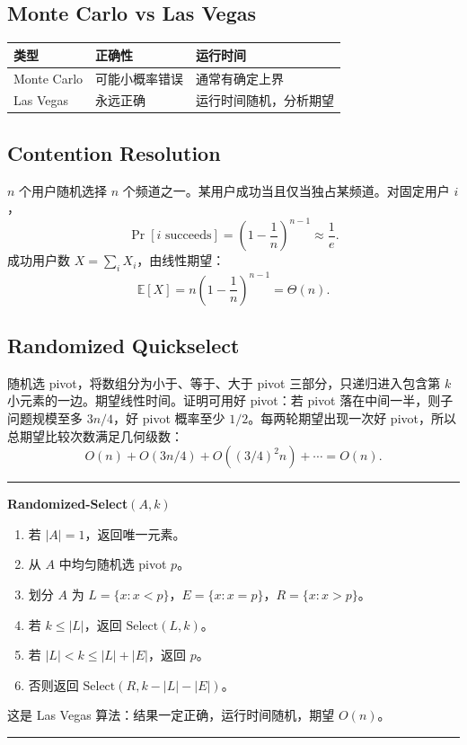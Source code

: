 \documentclass[UTF8,a4paper,11pt]{ctexart}
\newenvironment{algobox}[1]
{\par\medskip\noindent\begin{minipage}{0.96\linewidth}\hrule\vspace{0.35em}\textbf{#1}\par\vspace{0.25em}\small}
{\par\vspace{0.25em}\hrule\end{minipage}\par\medskip}
\begin{document}
\subsection{Monte Carlo vs Las Vegas}

\begin{center}
\begin{tabular}{lll}
\toprule
类型 & 正确性 & 运行时间\\
\midrule
Monte Carlo & 可能小概率错误 & 通常有确定上界\\
Las Vegas & 永远正确 & 运行时间随机，分析期望\\
\bottomrule
\end{tabular}
\end{center}

\subsection{Contention Resolution}

$n$ 个用户随机选择 $n$ 个频道之一。某用户成功当且仅当独占某频道。对固定用户 $i$，
\[
\Pr[i\text{ succeeds}]=\left(1-\frac1n\right)^{n-1}\approx \frac1e.
\]
成功用户数 $X=\sum_i X_i$，由线性期望：
\[
\mathbb E[X]=n\left(1-\frac1n\right)^{n-1}=\Theta(n).
\]

\subsection{Randomized Quickselect}

随机选 pivot，将数组分为小于、等于、大于 pivot 三部分，只递归进入包含第 $k$ 小元素的一边。期望线性时间。证明可用好 pivot：若 pivot 落在中间一半，则子问题规模至多 $3n/4$，好 pivot 概率至少 $1/2$。每两轮期望出现一次好 pivot，所以总期望比较次数满足几何级数：
\[
O(n)+O(3n/4)+O((3/4)^2n)+\cdots=O(n).
\]

\begin{algobox}{Randomized-Select$(A,k)$}
\begin{enumerate}
  \item 若 $|A|=1$，返回唯一元素。
  \item 从 $A$ 中均匀随机选 pivot $p$。
  \item 划分 $A$ 为 $L=\{x:x<p\}$，$E=\{x:x=p\}$，$R=\{x:x>p\}$。
  \item 若 $k\le |L|$，返回 $\mathrm{Select}(L,k)$。
  \item 若 $|L|<k\le |L|+|E|$，返回 $p$。
  \item 否则返回 $\mathrm{Select}(R,k-|L|-|E|)$。
\end{enumerate}
这是 Las Vegas 算法：结果一定正确，运行时间随机，期望 $O(n)$。
\end{algobox}
\end{document}
